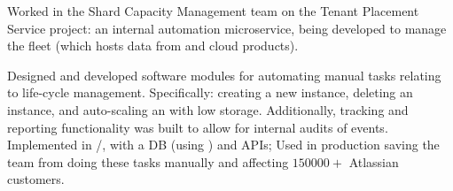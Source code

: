 \documentclass[a4paper]{oscar-resume}
\begin{document}
\begin{minipage}[t]{0.66\textwidth}
    \begin{tightitemize}
        \item {Worked in the Shard Capacity Management team on the Tenant Placement Service project: an internal \aws{} automation microservice, being developed to manage the \rds{} fleet (which hosts data from \jira{} and \conf{} cloud products).}
        \item {Designed and developed software modules for automating manual tasks relating to \rds{} life-cycle management. Specifically: creating a new \rds{} instance, deleting an \rds{} instance, and auto-scaling an \rds{} with low storage. Additionally, tracking and reporting functionality was built to allow for internal audits of \rds{} events. Implemented in \kotlin{}/\spring{}, with a \postgres{} DB (using \jpa{}) and \rest{} APIs; Used in production saving the team from doing these tasks manually and affecting $\num{150000} +$ Atlassian customers.}
    \end{tightitemize}
    \smallsectionspace{}

\end{minipage}
\end{document}
